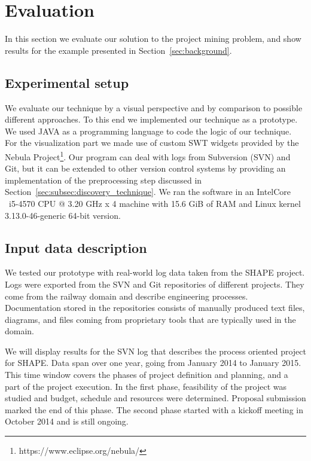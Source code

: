 \section{Evaluation}\label{sec:evaluation}

In this section we evaluate our solution to the project mining problem, and show results for the example presented in Section~\ref{sec:background}.

\subsection{Experimental setup}

%

We evaluate our technique by a visual perspective and by comparison to possible different approaches. To this end we implemented our technique as a prototype. We used JAVA as a programming language to code the logic of our technique. For the visualization part we made use of custom SWT widgets provided by the Nebula Project\footnote{https://www.eclipse.org/nebula/}. Our program can deal with logs from Subversion (SVN) \cite{pilato2008version} and Git\cite{torvalds2010git}, but it can be extended to other version control systems by providing an implementation of the preprocessing step discussed in Section~\ref{sec:subsec:discovery_technique}.
We ran the software in an Intel\textregistered Core \texttrademark~i5-4570 CPU @ 3.20 GHz x 4 machine with 15.6 GiB of RAM and Linux kernel 3.13.0-46-generic 64-bit version.

\subsection{Input data description}

We tested our prototype with real-world log data taken from the SHAPE project. Logs were exported from the SVN and Git repositories of different projects. They come from the railway domain and describe engineering processes. Documentation stored in the repositories consists of manually produced text files, diagrams, and files coming from proprietary tools that are typically used in the domain.

We will display results for the SVN log that describes the process oriented project for SHAPE. Data span over one year, going from January 2014 to January 2015. This time window covers the phases of project definition and planning, and a part of the project execution. In the first phase, feasibility of the project was studied and budget, schedule and resources were determined. Proposal submission marked the end of this phase. The second phase started with a kickoff meeting in October 2014 and is still ongoing.

